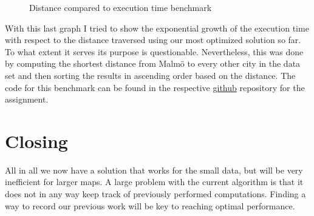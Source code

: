 \documentclass[a4paper,11pt]{article}
\begin{document}
\begin{figure}[H]
    \centering
    \caption{Distance compared to execution time benchmark}
    \label{fig:plot1}
\end{figure}
 With this last graph I tried to show the exponential growth of the execution time with respect to the distance traversed using our most optimized solution so far. To what extent it serves its purpose is questionable. Nevertheless, this was done by computing the shortest distance from Malmö to every other city in the data set and then sorting the results in ascending order based on the distance. The code for this benchmark can be found in the respective \href{https://github.com/kexana/Algorithms-and-Data-Structures-ID1021}{github} repository for the assignment.

 \section*{Closing}
All in all we now have a solution that works for the small data, but will be
very inefficient for larger maps. A large problem with the current algorithm is that it does not in any way keep track of previously performed computations. Finding a way to record our previous work will be key to reaching optimal performance.
 
\end{document}
